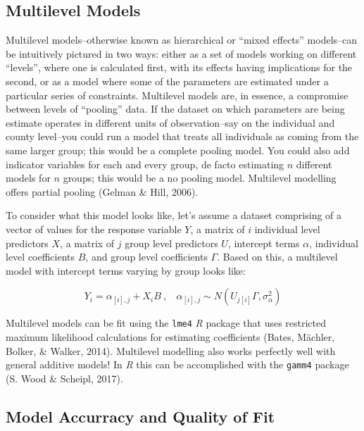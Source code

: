 \documentclass[12pt,twoside]{reedthesis}
\begin{document}
  \subsection{Multilevel Models}\label{multilevel-models}
  
  Multilevel models--otherwise known as hierarchical or ``mixed effects''
  models--can be intuitively pictured in two ways: either as a set of
  models working on different ``levels'', where one is calculated first,
  with its effects having implications for the second, or as a model where
  some of the parameters are estimated under a particular series of
  constraints. Multilevel models are, in essence, a compromise between
  levels of ``pooling'' data. If the dataset on which parameters are being
  estimate operates in different units of observation--say on the
  individual and county level--you could run a model that treats all
  individuals as coming from the same larger group; this would be a
  complete pooling model. You could also add indicator variables for each
  and every group, de facto estimating \(n\) different models for \(n\)
  groups; this would be a no pooling model. Multilevel modelling offers
  partial pooling (Gelman \& Hill, 2006).
  
  To consider what this model looks like, let's assume a dataset
  comprising of a vector of values for the response variable \(Y\), a
  matrix of \(i\) individual level predictors \(X\), a matrix of \(j\)
  group level predictors \(U\), intercept terms \(\alpha\), individual
  level coefficients \(B\), and group level coefficients \(\Gamma\). Based
  on this, a multilevel model with intercept terms varying by group looks
  like:
  
  \[Y_i = \alpha_{[i], j} + X_iB~,~~~~\alpha_{[i], j} \sim N(U_{j[i]}\Gamma, \sigma_{\alpha}^2)\]
  
  Multilevel models can be fit using the \texttt{lme4} \textit{R} package
  that uses restricted maximum likelihood calculations for estimating
  coefficients (Bates, Mächler, Bolker, \& Walker, 2014). Multilevel
  modelling also works perfectly well with general additive models! In
  \textit{R} this can be accomplished with the \texttt{gamm4} package (S.
  Wood \& Scheipl, 2017).
  
  \subsection{Model Accurracy and Quality of
  Fit}\label{model-accurracy-and-quality-of-fit}
  
\end{document}
